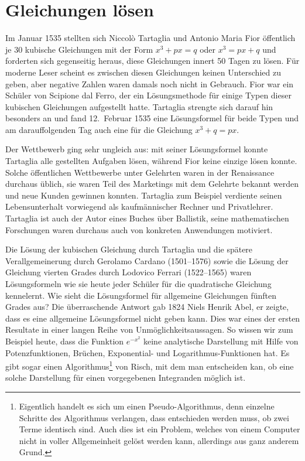 %
%
%
\chapter{Gleichungen lösen\label{chapter:gleichungen}}
\rhead{}
Im Januar 1535 stellten sich Niccolò Tartaglia und 
Antonio Maria Fior öffentlich je 30 kubische Gleichungen mit
der Form $x^3 + px = q$ oder $x^3 = px + q$ und forderten sich
gegenseitig heraus, diese Gleichungen innert 50 Tagen zu lösen.
Für moderne Leser scheint es zwischen diesen Gleichungen keinen 
Unterschied zu geben, aber negative Zahlen waren damals noch nicht
in Gebrauch.
Fior war ein Schüler von Scipione dal Ferro, der ein Lösungsmethode
für einige Typen dieser kubischen Gleichungen aufgestellt hatte.
Tartaglia strengte sich darauf hin besonders an und fand 12.~Februar
1535 eine Lösungsformel für beide Typen und am darauffolgenden Tag
auch eine für die Gleichung $x^3 + q = px$.

Der Wettbewerb ging sehr ungleich aus: mit seiner Lösungsformel konnte
Tartaglia alle gestellten Aufgaben lösen, während Fior keine einzige
lösen konnte.
Solche öffentlichen Wettbewerbe unter Gelehrten waren in der
Renaissance durchaus üblich, sie waren Teil des Marketings mit dem
Gelehrte bekannt werden und neue Kunden gewinnen konnten.
Tartaglia zum Beispiel verdiente seinen Lebensunterhalt vorwiegend
als kaufmännischer Rechner und Privatlehrer.
Tartaglia ist auch der Autor eines Buches über Ballistik, seine
mathematischen Forschungen waren durchaus auch von konkreten 
Anwendungen motiviert.

Die Lösung der kubischen Gleichung durch Tartaglia und die spätere
Verallgemeinerung durch Gerolamo Cardano (1501--1576) sowie die 
Lösung der Gleichung vierten Grades durch Lodovico Ferrari (1522--1565)
waren Lösungsformeln wie sie heute jeder Schüler für die quadratische
Gleichung kennelernt.
Wie sieht die Lösungsformel für allgemeine Gleichungen fünften
Grades aus?
Die überraschende Antwort gab 1824 Niels Henrik Abel, er zeigte,
dass es eine allgemeine Lösungsformel nicht geben kann.
Dies war eines der ersten Resultate in einer langen Reihe von
Unmöglichkeitsaussagen.
So wissen wir zum Beispiel heute, dass die Funktion $e^{-x^2}$ 
keine analytische Darstellung mit Hilfe von Potenzfunktionen,
Brüchen, Exponential- und Logarithmus-Funktionen hat.
Es gibt sogar einen Algorithmus\footnote{Eigentlich handelt es
sich um einen Pseudo-Algorithmus, denn einzelne Schritte des Algorithmus
verlangen, dass entschieden werden muss, ob zwei Terme identisch sind.
Auch dies ist ein Problem, welches von einem Computer nicht in voller
Allgemeinheit gelöst werden kann, allerdings aus ganz anderem Grund.}
von Risch, mit dem man entscheiden kan, ob eine solche Darstellung
für einen vorgegebenen Integranden möglich ist.

